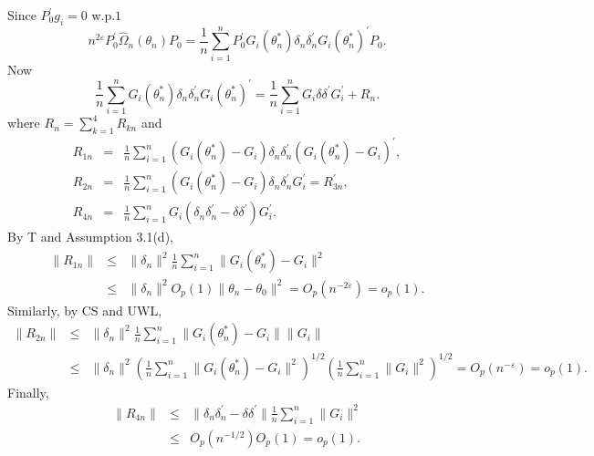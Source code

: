 \documentclass[hidelinks, 11 pt, a4paper, pdflatex]{article}
\begin{document}
{  Since $P_{0}^{\prime}g_{i} = 0$ w.p.$1$
   \[
    n^{2\varepsilon}P_{0}^{\prime}\hat{\Omega}_{n}(\theta_{n})P_{0} = \frac{1}{n}
                                                                      \sum_{i=1}^{n}
                                                                      P_{0}^{\prime}G_{i}(\theta_{n}^{\ast})\delta_{n} \delta_{n}^{\prime}G_{i}(\theta_{n}^{\ast})^{\prime}P_{0}.
   \]
  Now
   \[
    \frac{1}{n}
    \sum_{i=1}^{n}
    G_{i}(\theta_{n}^{\ast})\delta_{n} \delta_{n}^{\prime}G_{i}(\theta_{n}^{\ast})^{\prime}
    =
    \frac{1}{n}
    \sum_{i=1}^{n}
    G_{i}\delta \delta^{\prime}G_{i}^{\prime}
    +
    R_{n}.
   \]
  where $R_{n} = \sum_{k=1}^{4} R_{kn}$ and
   \begin{eqnarray*}
    R_{1n} & = & \frac{1}{n}
                 \sum_{i=1}^{n}
                 (G_{i}(\theta_{n}^{\ast}) - G_{i})\delta _{n} \delta_{n}^{\prime}(G_{i}(\theta_{n}^{\ast}) - G_{i})^{\prime}, \\
    R_{2n} & = & \frac{1}{n}
                 \sum_{i=1}^{n}
                 (G_{i}(\theta_{n}^{\ast}) - G_{i})\delta_{n} \delta _{n}^{\prime}G_{i}^{\prime} = R_{3n}^{\prime}, \\
    R_{4n} & = & \frac{1}{n}
                 \sum_{i=1}^{n}
                 G_{i}(\delta _{n}\delta _{n}^{\prime} - \delta \delta^{\prime})G_{i}^{\prime}.
   \end{eqnarray*}
  By T and Assumption 3.1(d),
   \begin{eqnarray*}
    \|R_{1n}\| & \leq & \|\delta_{n}\|^{2} \frac{1}{n} \sum_{i=1}^{n} \|G_{i}(\theta_{n}^{\ast}) - G_{i}\|^{2} \\
               & \leq & \|\delta_{n}\|^{2} O_{p}(1)\|\theta_{n} - \theta_{0}\|^{2} = O_{p}(n^{-2\varepsilon}) = o_{p}(1).
   \end{eqnarray*}
  Similarly, by CS and UWL,
   \begin{eqnarray*}
    \|R_{2n}\| & \leq & \|\delta_{n}\|^{2} \frac{1}{n} \sum_{i=1}^{n} \|G_{i}(\theta_{n}^{\ast}) - G_{i}\| \|G_{i}\| \\
               & \leq & \|\delta_{n}\|^{2} (\frac{1}{n} \sum_{i=1}^{n} \|G_{i}(\theta_{n}^{\ast}) - G_{i}\|^{2})^{1/2}
                         (\frac{1}{n} \sum_{i=1}^{n} \|G_{i}\|^{2})^{1/2} = O_{p}(n^{-\varepsilon}) = o_{p}(1).
   \end{eqnarray*}%
  Finally,
   \begin{eqnarray*}
    \|R_{4n}\| & \leq & \|\delta_{n}\delta_{n}^{\prime} - \delta\delta^{\prime}\| \frac{1}{n} \sum_{i=1}^{n} \|G_{i}\|^{2} \\
               & \leq & O_{p}(n^{-1/2})O_{p}(1) = o_{p}(1).
   \end{eqnarray*}

}
\end{document}
